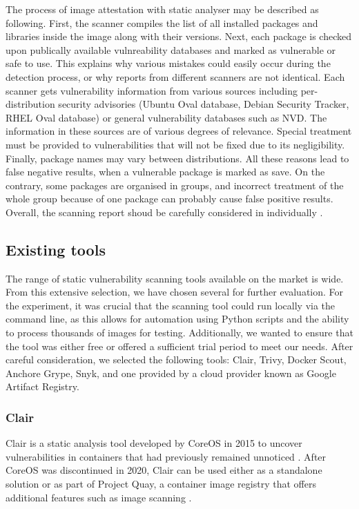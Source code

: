 The process of image attestation with static analyser may be described as following. First, the scanner compiles the list of all installed packages and libraries inside the image along with their versions. Next, each package is checked upon publically available vulnreability databases and marked as vulnerable or safe to use. This explains why various mistakes could easily occur during the detection process, or why reports from different scanners are not identical. Each scanner gets vulnerability information from various sources including per-distribution security advisories (Ubuntu Oval database, Debian Security Tracker, RHEL Oval database) or general vulnerability databases such as NVD. The information in these sources are of various degrees of relevance. Special treatment must be provided to vulnerabilities that will not be fixed due to its negligibility. Finally, package names may vary between distributions. All these reasons lead to false negative results, when a vulnerable package is marked as save. On the contrary, some packages are organised in groups, and incorrect treatment of the whole group because of one package can probably cause false positive results. Overall, the scanning report shoud be carefully considered in individually \cite{book:rice}.

\clearpage
\subsection{Existing tools}

The range of static vulnerability scanning tools available on the market is wide. From this extensive selection, we have chosen several for further evaluation. For the experiment, it was crucial that the scanning tool could run locally via the command line, as this allows for automation using Python scripts and the ability to process thousands of images for testing. Additionally, we wanted to ensure that the tool was either free or offered a sufficient trial period to meet our needs. After careful consideration, we selected the following tools: Clair, Trivy, Docker Scout, Anchore Grype, Snyk, and one provided by a cloud provider known as Google Artifact Registry.

\subsubsection{Clair}

Clair is a static analysis tool developed by CoreOS in 2015 to uncover vulnerabilities in containers that had previously remained unnoticed \cite{s:clair2015}. After CoreOS was discontinued in 2020, Clair can be used either as a standalone solution or as part of Project Quay, a container image registry that offers additional features such as image scanning \cite{s:what-is-clair}.

